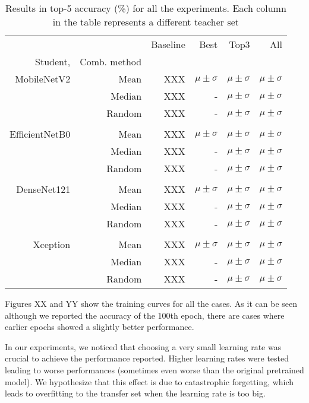 \documentclass{elsarticle}
\begin{document}
	\begin{table}[h]
	\small
	\centering
	\caption{Results in top-5 accuracy (\%) for all the experiments. Each column in the table represents a different teacher set}
	\begin{tabular}{rrrrrr}\toprule
		& &Baseline &Best &Top3 &All \\
		Student, &Comb. method & & & & \\\midrule
		MobileNetV2 &Mean &XXX &$\mu \pm \sigma$ &$\mu \pm \sigma$ &$\mu \pm \sigma$ \\
		&Median &XXX &- &$\mu \pm \sigma$ &$\mu \pm \sigma$ \\
		&Random &XXX &- &$\mu \pm \sigma$ &$\mu \pm \sigma$ \\
		& & & & & \\
		EfficientNetB0 &Mean &XXX &$\mu \pm \sigma$ &$\mu \pm \sigma$ &$\mu \pm \sigma$ \\
		&Median &XXX&- &$\mu \pm \sigma$ &$\mu \pm \sigma$ \\
		&Random &XXX&- &$\mu \pm \sigma$ &$\mu \pm \sigma$ \\
		& & & & & \\
		DenseNet121 &Mean &XXX &$\mu \pm \sigma$ &$\mu \pm \sigma$ &$\mu \pm \sigma$ \\
		&Median &XXX &- &$\mu \pm \sigma$ &$\mu \pm \sigma$ \\
		&Random &XXX &- &$\mu \pm \sigma$ &$\mu \pm \sigma$ \\
		& & & & & \\
		Xception &Mean &XXX &$\mu \pm \sigma$ &$\mu \pm \sigma$ &$\mu \pm \sigma$ \\
		&Median &XXX &- &$\mu \pm \sigma$ &$\mu \pm \sigma$ \\
		&Random &XXX &- &$\mu \pm \sigma$ &$\mu \pm \sigma$ \\
		\bottomrule
	\end{tabular}
\end{table}
	
	Figures XX and YY show the training curves for all the cases. As it can be seen although we reported the accuracy of the 100th epoch, there are cases where earlier epochs showed a slightly better performance.
	
	In our experiments, we noticed that choosing a very small learning rate was crucial to achieve the performance reported. Higher learning rates were tested leading to worse performances (sometimes even worse than the original pretrained model). We hypothesize that this effect is due to catastrophic forgetting, which leads to overfitting to the transfer set when the learning rate is too big.
			
\end{document}
